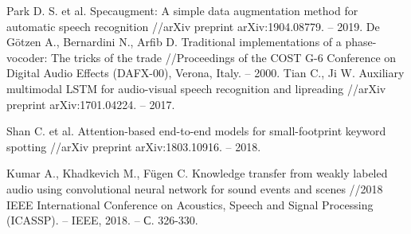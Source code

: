 \documentclass[a4paper,12pt]{article}
\begin{document}
 	
 	
 	
 	\newpage
\begin{thebibliography}{9}
	
	Park D. S. et al. Specaugment: A simple data augmentation method for automatic speech recognition //arXiv preprint arXiv:1904.08779. – 2019.
	 De Götzen A., Bernardini N., Arfib D. Traditional implementations of a phase-vocoder: The tricks of the trade //Proceedings of the COST G-6 Conference on Digital Audio Effects (DAFX-00), Verona, Italy. – 2000.
	Tian C., Ji W. Auxiliary multimodal LSTM for audio-visual speech recognition and lipreading //arXiv preprint arXiv:1701.04224. – 2017.
	
	 Shan C. et al. Attention-based end-to-end models for small-footprint keyword spotting //arXiv preprint arXiv:1803.10916. – 2018.
	
	Kumar A., Khadkevich M., Fügen C. Knowledge transfer from weakly labeled audio using convolutional neural network for sound events and scenes //2018 IEEE International Conference on Acoustics, Speech and Signal Processing (ICASSP). – IEEE, 2018. – С. 326-330.
\end{thebibliography} 
 	
\end{document}
